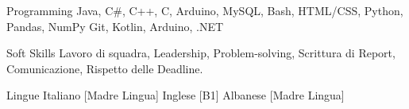 

\begin{cvskills}

  \cvskill
    {Programming} %
    {Java, C\#, C++, C, Arduino, MySQL, Bash, HTML/CSS, Python, Pandas, NumPy Git, Kotlin, Arduino, .NET} %

  \cvskill
    {Soft Skills} %
    {Lavoro di squadra, Leadership, Problem-solving, Scrittura di Report, Comunicazione, Rispetto delle Deadline.} %

  \cvskill
    {Lingue} %
    {Italiano [Madre Lingua] \quad Inglese [B1] \quad Albanese [Madre Lingua]} %

\end{cvskills}
